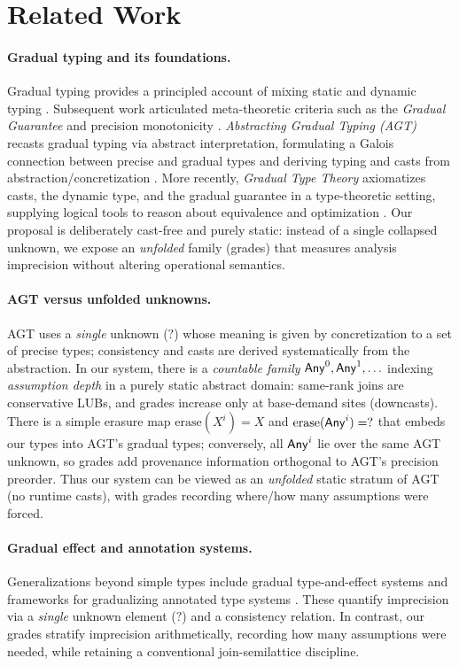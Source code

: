 \section{Related Work}
\label{sec:related}

\paragraph{Gradual typing and its foundations.}
Gradual typing provides a principled account of mixing static and dynamic typing \cite{SiekTaha2006}. Subsequent work articulated meta-theoretic criteria such as the \emph{Gradual Guarantee} and precision monotonicity \cite{SiekGarciaTaha2015}. \emph{Abstracting Gradual Typing (AGT)} recasts gradual typing via abstract interpretation, formulating a Galois connection between precise and gradual types and deriving typing and casts from abstraction/concretization \cite{GarciaClarkTanter2016}. More recently, \emph{Gradual Type Theory} axiomatizes casts, the dynamic type, and the gradual guarantee in a type-theoretic setting, supplying logical tools to reason about equivalence and optimization \cite{NewLicataAhmed2021}. Our proposal is deliberately cast-free and purely static: instead of a single collapsed unknown, we expose an \emph{unfolded} family (grades) that measures analysis imprecision without altering operational semantics.

\paragraph{AGT versus unfolded unknowns.}
AGT uses a \emph{single} unknown ($?$) whose meaning is given by concretization to a set of precise types; consistency and casts are derived systematically from the abstraction. In our system, there is a \emph{countable family} $\mathsf{Any}^{0},\mathsf{Any}^{1},\ldots$ indexing \emph{assumption depth} in a purely static abstract domain: same-rank joins are conservative LUBs, and grades increase only at base-demand sites (downcasts). There is a simple erasure map $\mathrm{erase}(X^{i})=X$ and $\mathrm{erase}(\mathsf{Any}^{i})=?$ that embeds our types into AGT’s gradual types; conversely, all $\mathsf{Any}^{i}$ lie over the same AGT unknown, so grades add provenance information orthogonal to AGT’s precision preorder. Thus our system can be viewed as an \emph{unfolded} static stratum of AGT (no runtime casts), with grades recording where/how many assumptions were forced.

\paragraph{Gradual effect and annotation systems.}
Generalizations beyond simple types include gradual type-and-effect systems \cite{BanadosSchwerterGarciaTanter2016} and frameworks for gradualizing annotated type systems \cite{ThiemannFennell2014}. These quantify imprecision via a \emph{single} unknown element ($?$) and a consistency relation. In contrast, our grades stratify imprecision arithmetically, recording how many assumptions were needed, while retaining a conventional join-semilattice discipline.

